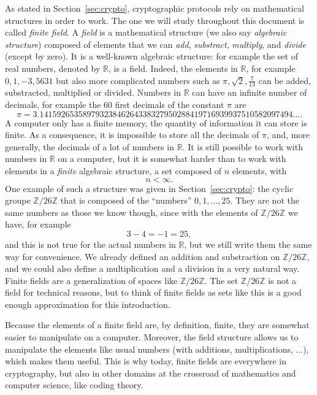 As stated in Section~\ref{sec:crypto}, cryptographic protocols rely on
mathematical structures in order to work. The one we will study throughout this
document is called \emph{finite field}. A \emph{field} is a mathematical
structure (we also say \emph{algebraic structure}) composed of elements that we
can \emph{add}, \emph{substract}, \emph{multiply}, and \emph{divide} (except by
zero). It is a well-known algebraic structure: for example the set of real
numbers, denoted by $\mathbb{R}$, is a field. Indeed, the elements in
$\mathbb{R}$, for example $0, 1, -3, 5631$ but also more complicated numbers
such as $\pi, \sqrt 2, \frac{7}{13}$ can be added, substracted, multiplied or
divided. Numbers in $\mathbb{R}$ can have an infinite number of decimals, for
example the $60$ first decimals of the constant $\pi$ are
\[
  \pi = 3.14159265358979323846264338327950288419716939937510582097494\dots.
\]
A computer only has a finite memory, \ie the quantity of information it can
store is finite. As a consequence, it is impossible to store all the decimals of
$\pi$, and, more generally, the decimals of a lot of numbers in $\mathbb{R}$. It
is still possible to work with numbers in $\mathbb{R}$ on a computer, but it is
somewhat harder than to work with elements in a \emph{finite} algebraic
structure, \ie a set composed of $n$ elements, with
\[
  n < \infty.
\]
One example of such a structure was given in Section~\ref{sec:crypto}: the
cyclic groupe $\mathbb{Z}/26\mathbb{Z}$ that is composed of the ``numbers'' $0,
1, \dots, 25$. They are not the same numbers as those we know though, since with
the elements of $\mathbb{Z}/26\mathbb{Z}$ we have, for example
\[
  3 - 4 = -1 = 25,
\]
and this is not true for the actual numbers in $\mathbb{R}$, but we still write
them the same way for convenience. We already defined an
addition and substraction on $\mathbb{Z}/26\mathbb{Z}$, and we could also define
a multiplication and a division in a very natural way. Finite fields are a
generalization of spaces like
$\mathbb{Z}/26\mathbb{Z}$. The set $\mathbb{Z}/26\mathbb{Z}$ is not a field for
technical reasons, but to think of finite fields as sets like this is a good
enough approximation for this introduction.

Because the elements of a finite field are, by definition, finite, they are
somewhat easier to manipulate on a computer. Moreover, the field structure
allows us to manipulate the elements like usual numbers (\ie with additions,
multiplications, ...), which makes them useful. This is why today, finite fields
are everywhere in cryptography, but also in other domains at the crossroad of
mathematics and computer science, like coding theory.

